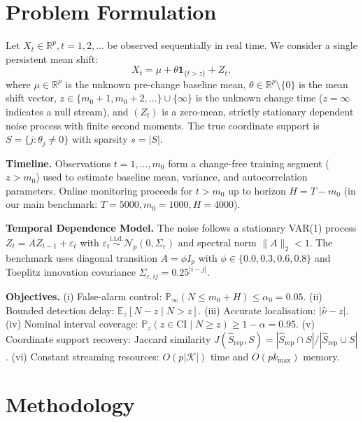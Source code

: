 \documentclass[lettersize,journal]{IEEEtran}
\begin{document}
\section{Problem Formulation}
Let $X_t \in \mathbb{R}^p, t = 1, 2, \ldots$ be observed sequentially in real time. We consider a single persistent mean shift:
\begin{equation}
    X_t = \mu + \theta \mathbf{1}_{\{t > z\}} + Z_t, \label{eq:model}
\end{equation}
where $\mu \in \mathbb{R}^p$ is the unknown pre-change baseline mean, $\theta \in \mathbb{R}^p \setminus \{0\}$ is the mean shift vector, $z \in \{m_0+1, m_0+2, \ldots\} \cup \{\infty\}$ is the unknown change time ($z=\infty$ indicates a null stream), and $(Z_t)$ is a zero-mean, strictly stationary dependent noise process with finite second moments. The true coordinate support is $S = \{j : \theta_j \neq 0\}$ with sparsity $s = |S|$.

\textbf{Timeline.} Observations $t = 1, \ldots, m_0$ form a change-free training segment ($z > m_0$) used to estimate baseline mean, variance, and autocorrelation parameters. Online monitoring proceeds for $t > m_0$ up to horizon $H = T - m_0$ (in our main benchmark: $T = 5000, m_0 = 1000, H = 4000$).

\textbf{Temporal Dependence Model.} The noise follows a stationary VAR(1) process $Z_t = A Z_{t-1} + \varepsilon_t$ with $\varepsilon_t \overset{\text{i.i.d.}}{\sim} \mathcal{N}_p(0, \Sigma_\varepsilon)$ and spectral norm $\|A\|_2 < 1$. The benchmark uses diagonal transition $A = \phi I_p$ with $\phi \in \{0.0, 0.3, 0.6, 0.8\}$ and Toeplitz innovation covariance $\Sigma_{\varepsilon, ij} = 0.25^{|i-j|}$.

\textbf{Objectives.} (i) False-alarm control: $\mathbb{P}_\infty(N \le m_0 + H) \le \alpha_0 = 0.05$. (ii) Bounded detection delay: $\mathbb{E}_z[N - z \mid N > z]$. (iii) Accurate localisation: $|\hat{\nu} - z|$. (iv) Nominal interval coverage: $\mathbb{P}_z(z \in \text{CI} \mid N \ge z) \ge 1 - \alpha = 0.95$. (v) Coordinate support recovery: Jaccard similarity $J(\hat{S}_{\text{rep}}, S) = |\hat{S}_{\text{rep}} \cap S| / |\hat{S}_{\text{rep}} \cup S|$. (vi) Constant streaming resources: $O(p|\mathcal{K}|)$ time and $O(pk_{\max})$ memory.

\section{Methodology}
\end{document}
